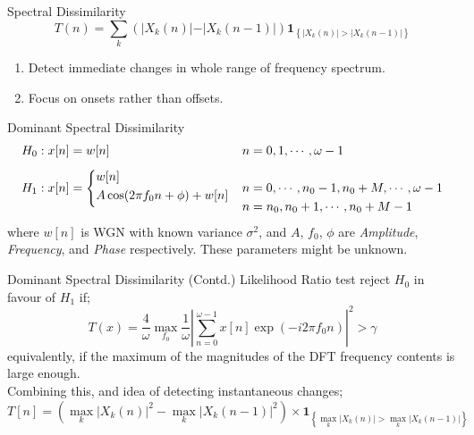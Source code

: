 \documentclass[10pt]{beamer}
\begin{document}
\begin{frame}{Spectral Dissimilarity}
    $$T(n) = \sum_{k} \left(\vert X_k(n) \vert - \vert X_k(n-1) \vert\right) \textbf{1}_{\left\{\vert X_k(n) \vert > \vert X_k(n-1) \vert\right\}}$$
    \begin{enumerate}
        \item Detect immediate changes in whole range of frequency spectrum.
        \item Focus on onsets rather than offsets.
    \end{enumerate}
\end{frame}

\begin{frame}{Dominant Spectral Dissimilarity}
    \begin{align*}
H_0: x[n]&=w[n] && n=0,1,\cdots, \omega-1\\\\ 
H_1: x[n]&= \smash{\left\{\begin{array}{@{}l@{}}
           w[n] \\[\jot] 
           A\cos(2\pi f_0n+\phi)+w[n] \\[\jot] 
           \end{array}\right.} && n=0,\cdots, n_0-1, n_0+M, \cdots, \omega-1 \\
  & && n=n_0,n_0+1,\cdots, n_0+M-1
 \end{align*}
where $w[n]$ is WGN with known variance $\sigma^2$, and $A$, $f_0$, $\phi$ are \textit{Amplitude}, \textit{Frequency}, and \textit{Phase} respectively. These parameters might be unknown.
\end{frame}

\begin{frame}{Dominant Spectral Dissimilarity (Contd.)}
    Likelihood Ratio test reject $H_0$ in favour of $H_1$ if;
    $$T(x) = \dfrac{4}{\omega}\max_{f_0}\dfrac{1}{\omega}\left|\displaystyle\sum_{n=0}^{\omega-1}x[n]\exp(-i2\pi f_0n)\right|^2 > \gamma$$
    equivalently, if the maximum of the magnitudes of the DFT frequency contents is large enough.\\
    Combining this, and idea of detecting instantaneous changes;
    $$T[n] = \left(\max_k \vert X_k(n)\vert^2 - \max_k\vert X_k(n-1)\vert^2\right)\times \textbf{1}_{\left\{\max_k \vert X_k(n)\vert > \max_k\vert X_k(n-1)\vert\right\}}$$
\end{frame}
\end{document}
